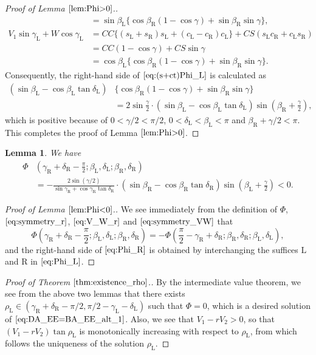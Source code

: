 \documentclass[11pt]{amsart}
\newtheorem{lemma}[theorem]{Lemma}
\numberwithin{equation}{section}
\numberwithin{theorem}{section}
\newcommand{\Lt}{\ensuremath{\mathrm{L}}}
\newcommand{\Rt}{\ensuremath{\mathrm{R}}}
\begin{document}
\begin{proof}[Proof of Lemma $\ref{lem:Phi>0}$.]
\begin{align*}
&=\sin\beta_\Lt\{\cos\beta_\Rt (1-\cos\gamma )+\sin\beta_\Rt\sin\gamma\} ,\\
V_1\sin\gamma_\Lt +W\cos\gamma_\Lt&=CC\{(s_\Lt + s_\Rt )s_\Lt +(c_\Lt -c_\Rt )c_\Lt\} +CS(s_\Lt c_\Rt +c_\Lt s_\Rt )\\
&=CC(1-\cos\gamma )+CS\sin\gamma\\
&=\cos\beta_\Lt\{\cos\beta_\Rt (1-\cos\gamma )+\sin\beta_\Rt\sin\gamma\} .
\end{align*}
Consequently, the right-hand side of $\eqref{eq:(s+ct)Phi_L}$ is calculated as
\begin{align*}
(\sin\beta_\Lt -\cos\beta_\Lt\tan\delta_\Lt )&\{\cos\beta_\Rt (1-\cos\gamma )+\sin\beta_\Rt\sin\gamma\}\\
&=2\sin\frac{\gamma}{2}\cdot (\sin\beta_\Lt -\cos\beta_\Lt\tan\delta_\Lt )\sin\left(\beta_\Rt +\frac{\gamma}{2}\right) ,
\end{align*}
which is positive because of $0<\gamma /2<\pi /2$, $0<\delta_\Lt <\beta_\Lt <\pi$ and $\beta_\Rt +\gamma /2<\pi$.
This completes the proof of Lemma $\ref{lem:Phi>0}$.
\end{proof}
\begin{lemma}\label{lem:Phi<0}
We have 
\begin{equation}\label{eq:Phi_R}
\begin{aligned}
\Phi&\left(\gamma_\Rt +\delta_\Rt -\frac{\pi}{2};\beta_\Lt ,\delta_\Lt ;\beta_\Rt ,\delta_\Rt\right)\\
&=-\frac{2\sin (\gamma /2)}{\sin\gamma_\Rt +\cos\gamma_\Rt\tan\delta_\Rt}
\cdot (\sin\beta_\Rt -\cos\beta_\Rt\tan\delta_\Rt )\sin\left(\beta_\Lt +\frac{\gamma}{2}\right) <0.
\end{aligned}
\end{equation}
\end{lemma}
\begin{proof}[Proof of Lemma $\ref{lem:Phi<0}$.]
We see immediately from the definition of $\Phi$, $\eqref{eq:symmetry_r}$, $\eqref{eq:V_W_r}$ and $\eqref{eq:symmetry_VW}$ that
\begin{equation*}
\Phi\left(\gamma_\Rt +\delta_\Rt -\frac{\pi}{2};\beta_\Lt ,\delta_\Lt ;\beta_\Rt ,\delta_\Rt\right)
=-\Phi\left(\frac{\pi}{2}-\gamma_\Rt +\delta_\Rt ;\beta_\Rt ,\delta_\Rt ;\beta_\Lt ,\delta_\Lt\right) ,
\end{equation*}
and the right-hand side of $\eqref{eq:Phi_R}$ is obtained by interchanging the suffices $\Lt$ and $\Rt$ in $\eqref{eq:Phi_L}$.
\end{proof}
\begin{proof}[Proof of Theorem $\ref{thm:existence_rho}$.]
By the intermediate value theorem, we see from the above two lemmas that
there exists $\rho_\Lt\in (\gamma_\Rt +\delta_\Rt -\pi /2, \pi /2-\gamma_\Lt -\delta_\Lt )$ such that $\Phi =0$, 
which is a desired solution of $\eqref{eq:DA_EE=BA_EE_alt_1}$.
Also, we see that $V_1-rV_2>0$, so that $(V_1-rV_2)\tan\rho_\Lt$ is monotonically increasing with respect to $\rho_\Lt$,
from which follows the uniqueness of the solution $\rho_\Lt$.
\end{proof}
\end{document}
